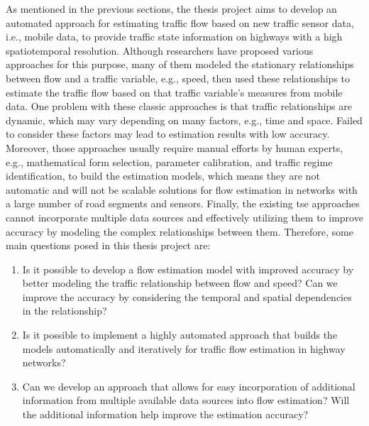 \documentclass[english]{kththesis}
\begin{document}
As mentioned in the previous sections, the thesis project aims to develop an automated approach for estimating traffic flow based on new traffic sensor data, i.e., mobile data, to provide traffic state information on highways with a high spatiotemporal resolution. Although researchers have proposed various approaches for this purpose, many of them modeled the stationary relationships between flow and a traffic variable, e.g., speed, then used these relationships to estimate the traffic flow based on that traffic variable's measures from mobile data. One problem with these classic approaches is that traffic relationships are dynamic, which may vary depending on many factors, e.g., time and space. Failed to consider these factors may lead to estimation results with low accuracy. Moreover, those approaches usually require manual efforts by human experts, e.g., mathematical form selection, parameter calibration, and traffic regime identification, to build the estimation models, which means they are not automatic and will not be scalable solutions for flow estimation in networks with a large number of road segments and sensors. Finally, the existing \gls{tse} approaches cannot incorporate multiple data sources and effectively utilizing them to improve accuracy by modeling the complex relationships between them. Therefore, some main questions posed in this thesis project are:
\begin{enumerate}
    \item Is it possible to develop a flow estimation model with improved accuracy by better modeling the traffic relationship between flow and speed? Can we improve the accuracy by considering the temporal and spatial dependencies in the relationship?
    \item Is it possible to implement a highly automated approach that builds the models automatically and iteratively for traffic flow estimation in highway networks?
    \item Can we develop an approach that allows for easy incorporation of additional information from multiple available data sources into flow estimation? Will the additional information help improve the estimation accuracy?
\end{enumerate}
\end{document}
